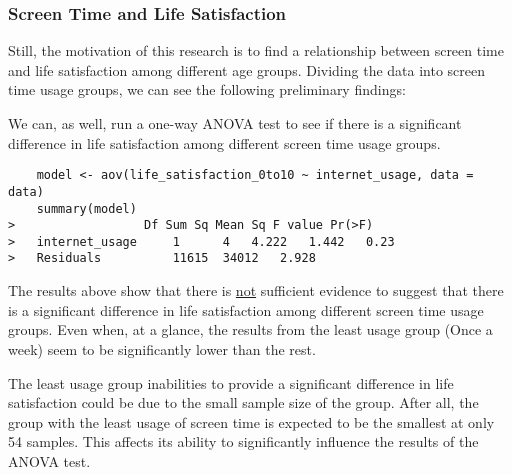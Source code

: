 \documentclass[12pt, a4paper]{article}
\begin{document}
\subsubsection*{Screen Time and Life Satisfaction}
\par Still, the motivation of this research is to find a relationship between screen time and life satisfaction among different age groups.
Dividing the data into screen time usage groups, we can see the following preliminary findings:
\begin{table}[h]
\end{table}
\par We can, as well, run a one-way ANOVA test to see if there is a significant difference in life satisfaction among different screen time usage groups.
\begin{verbatim}
    model <- aov(life_satisfaction_0to10 ~ internet_usage, data = data)
    summary(model)  
>                  Df Sum Sq Mean Sq F value Pr(>F)
>   internet_usage     1      4   4.222   1.442   0.23
>   Residuals          11615  34012   2.928
\end{verbatim}
\par The results above show that there is \underline{not} sufficient evidence to suggest that there is a significant difference in life satisfaction among different screen time usage groups.
Even when, at a glance, the results from the least usage group (Once a week) seem to be significantly lower than the rest.
\par The least usage group inabilities to provide a significant difference in life satisfaction could be due to the small sample size of the group.
After all, the group with the least usage of screen time is expected to be the smallest at only 54 samples.
This affects its ability to significantly influence the results of the ANOVA test.
\end{document}
